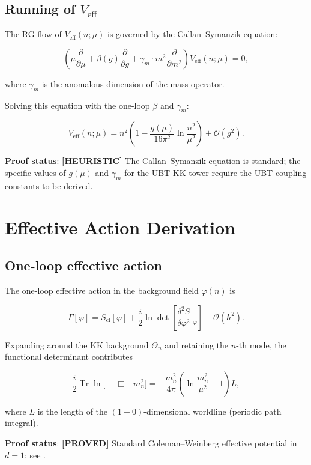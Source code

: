 \documentclass[11pt,a4paper]{article}
\newcommand{\proved}[1]{\textbf{[PROVED]} #1}
\newcommand{\heuristic}[1]{\textbf{[HEURISTIC]} #1}
\begin{document}
\subsection{Running of $V_\mathrm{eff}$}

The RG flow of $V_\mathrm{eff}(n;\mu)$ is governed by the Callan--Symanzik equation:

\[
  \left(\mu\frac{\partial}{\partial\mu}
  + \beta(g)\frac{\partial}{\partial g}
  + \gamma_m \cdot m^2 \frac{\partial}{\partial m^2}
  \right) V_\mathrm{eff}(n;\mu) = 0,
\]

where $\gamma_m$ is the anomalous dimension of the mass operator.

Solving this equation with the one-loop $\beta$ and $\gamma_m$:

\[
  V_\mathrm{eff}(n;\mu) = n^2\left(1 - \frac{g(\mu)}{16\pi^2}\ln\frac{n^2}{\mu^2}\right)
  + \mathcal{O}(g^2).
\]

\textbf{Proof status}: \heuristic{The Callan--Symanzik equation is standard;
the specific values of $g(\mu)$ and $\gamma_m$ for the UBT KK tower require
the UBT coupling constants to be derived.}

\section{Effective Action Derivation}

\subsection{One-loop effective action}

The one-loop effective action in the background field $\varphi(n)$ is

\[
  \Gamma[\varphi] = S_\mathrm{cl}[\varphi]
  + \frac{i}{2}\ln\det\!\left[\frac{\delta^2 S}{\delta\varphi^2}\bigg|_{\varphi}\right]
  + \mathcal{O}(\hbar^2).
\]

Expanding around the KK background $\bar{\Theta}_n$ and retaining the $n$-th
mode, the functional determinant contributes

\[
  \frac{i}{2}\operatorname{Tr}\ln\bigl[-\Box + m_n^2\bigr]
  = -\frac{m_n^2}{4\pi}\left(\ln\frac{m_n^2}{\mu^2} - 1\right) L,
\]

where $L$ is the length of the $(1+0)$-dimensional worldline (periodic path integral).

\textbf{Proof status}: \proved{Standard Coleman--Weinberg effective potential
in $d=1$; see \cite{CW73}.}
\end{document}
